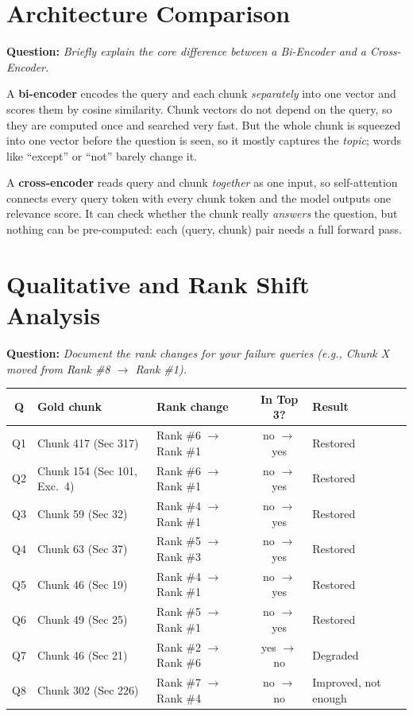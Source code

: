 \documentclass[10pt,a4paper]{article}
\newcommand{\q}[1]{\par\colorbox{black!6}{\parbox{\dimexpr\linewidth-2\fboxsep}{\small\textbf{Question:} \textit{#1}}}\par\smallskip}
\newcommand{\good}[1]{\textcolor{green!45!black}{#1}}
\newcommand{\bad}[1]{\textcolor{red!70!black}{#1}}
\begin{document}
\section{Architecture Comparison}
\q{Briefly explain the core difference between a Bi-Encoder and a Cross-Encoder.}

A \textbf{bi-encoder} encodes the query and each chunk \emph{separately} into one vector and scores them by cosine similarity.
Chunk vectors do not depend on the query, so they are computed once and searched very fast.
But the whole chunk is squeezed into one vector before the question is seen, so it mostly captures the \emph{topic}; words like ``except'' or ``not'' barely change it.

A \textbf{cross-encoder} reads query and chunk \emph{together} as one input, so self-attention connects every query token with every chunk token and the model outputs one relevance score.
It can check whether the chunk really \emph{answers} the question, but nothing can be pre-computed: each (query, chunk) pair needs a full forward pass.

\section{Qualitative and Rank Shift Analysis}
\q{Document the rank changes for your failure queries (e.g., Chunk X moved from Rank \#8 $\rightarrow$ Rank \#1).}

\begin{table}[H]\centering\small
{}
\begin{tabular}{@{}cllcl@{}}
\toprule
\textbf{Q} & \textbf{Gold chunk} & \textbf{Rank change} & \textbf{In Top 3?} & \textbf{Result}\\
\midrule
Q1 & Chunk 417 (Sec 317) & Rank \#6 $\rightarrow$ Rank \#1 & no $\rightarrow$ yes & \good{Restored}\\
Q2 & Chunk 154 (Sec 101, Exc.\ 4) & Rank \#6 $\rightarrow$ Rank \#1 & no $\rightarrow$ yes & \good{Restored}\\
Q3 & Chunk 59 (Sec 32) & Rank \#4 $\rightarrow$ Rank \#1 & no $\rightarrow$ yes & \good{Restored}\\
Q4 & Chunk 63 (Sec 37) & Rank \#5 $\rightarrow$ Rank \#3 & no $\rightarrow$ yes & \good{Restored}\\
Q5 & Chunk 46 (Sec 19) & Rank \#4 $\rightarrow$ Rank \#1 & no $\rightarrow$ yes & \good{Restored}\\
Q6 & Chunk 49 (Sec 25) & Rank \#5 $\rightarrow$ Rank \#1 & no $\rightarrow$ yes & \good{Restored}\\
Q7 & Chunk 46 (Sec 21) & Rank \#2 $\rightarrow$ Rank \#6 & yes $\rightarrow$ no & \bad{Degraded}\\
Q8 & Chunk 302 (Sec 226) & Rank \#7 $\rightarrow$ Rank \#4 & no $\rightarrow$ no & Improved, not enough\\
\bottomrule
\end{tabular}
\end{table}
\end{document}
